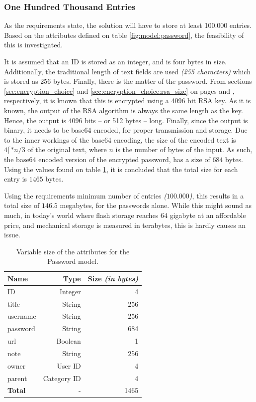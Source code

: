 			\subsubsection{One Hundred Thousand Entries}
				\label{sec:model:password:size}
				As the requirements state, the solution will have to store at least 100.000 entries. Based on the attributes defined on table \ref{fig:model:password}, the feasibility of this is investigated. 

				It is assumed that an ID is stored as an integer, and is four bytes in size. Additionally, the traditional length of text fields are used \emph{(255 characters)} which is stored as 256 bytes. Finally, there is the matter of the password. From sections \ref{sec:encryption_choice} and \ref{sec:encryption_choice:rsa_size} on pages \pageref{sec:encryption_choice} and \pageref{sec:encryption_choice:rsa_size}, respectively, it is known that this is encrypted using a 4096 bit RSA key. As it is known, the output of the RSA algorithm is always the same length as the key. Hence, the output is 4096 bits -- or 512 bytes -- long. Finally, since the output is binary, it needs to be base64 encoded, for proper transmission and storage. Due to the inner workings of the base64 encoding, the size of the encoded text is $4\lceil*{n/3}$ of the original text, where $n$ is the number of bytes of the input. As such, the base64 encoded version of the encrypted password, has a size of $684$ bytes. Using the values found on table \ref{tab:model:password:size}, it is concluded that the total size for each entry is $1465$ bytes.

				Using the requirements minimum number of entries \emph{($100.000$)}, this results in a total size of $146.5$ megabytes, for the passwords alone. While this might sound as much, in today's world where flash storage reaches $64$ gigabyte at an affordable price, and mechanical storage is measured in terabytes, this is hardly causes an issue.

				\begin{table}
					\centering
					\begin{tabular}{l | r | r}
						\textbf{Name}  			& \textbf{Type} 		& \textbf{Size \emph{(in bytes)}} 		\\
						\hline
						ID 						& Integer 			& 4						\\
						title 					& String 			& 256					\\
						username 				& String 			& 256					\\
						password 				& String 			& 684					\\
						url						& Boolean 			& 1						\\
						note  					& String 			& 256					\\
						owner 					& User ID 			& 4						\\
						parent 					& Category ID 		& 4						\\
						\hline\hline
						\textbf{Total} 			& - 				& 1465
					\end{tabular}
					\caption{Variable size of the attributes for the Password model.}
					\label{tab:model:password:size}
				\end{table}


